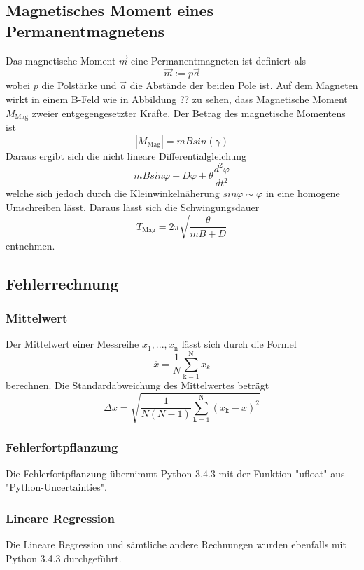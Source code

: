 \subsection{Magnetisches Moment eines Permanentmagnetens}
Das magnetische Moment $\vec{m}$  eine Permanentmagneten ist definiert als
\begin{equation}
  \vec{m} := p \vec{a}
  \label{eqn:m}
\end{equation}
wobei $p$ die Polstärke und $\vec{a}$ die Abstände der beiden Pole ist. Auf dem Magneten wirkt in einem B-Feld wie in Abbildung ?? zu sehen, dass Magnetische Moment $M_\text{Mag}$ zweier entgegengesetzter Kräfte. Der Betrag des magnetische Momentens ist
\begin{equation}
  |M_\text{Mag}| = m B sin(\gamma)
  \label{eqn:MM}
\end{equation}
Daraus ergibt sich die nicht lineare Differentialgleichung
\begin{equation}
  mBsin \varphi + D \varphi + \theta \frac{d^2 \varphi}{dt^2}
  \label{eqn:idgl}
\end{equation} welche sich jedoch durch die Kleinwinkelnäherung $sin \varphi \sim \varphi$ in eine homogene Umschreiben lässt. Daraus lässt sich die Schwingungsdauer
\begin{equation}
  T_\text{Mag} = 2 \pi \sqrt{\frac{\theta}{mB + D}}
  \label{eqn:Tmag}
\end{equation}
entnehmen.
\subsection{Fehlerrechnung}
\subsubsection{Mittelwert}
Der Mittelwert einer Messreihe $x_\text{1}, ... ,x_\text{n}$ lässt sich durch die Formel
\begin{equation}
	\overline{x} = \frac{1}{N} \sum_{\text{k}=1}^\text{N} x_k
	\label{eqn:ave}
\end{equation}
berechnen. Die Standardabweichung des Mittelwertes beträgt
\begin{equation}
	\Delta \overline{x} = \sqrt{ \frac{1}{N(N-1)} \sum_{\text{k}=1}^\text{N} (x_\text{k} - \overline{x})^2}
	\label{eqn:std}
\end{equation}

\subsubsection{Fehlerfortpflanzung}
Die Fehlerfortpflanzung übernimmt Python 3.4.3 mit der Funktion "ufloat" aus "Python-Uncertainties".

\subsubsection{Lineare Regression}
Die Lineare Regression und sämtliche andere Rechnungen wurden ebenfalls mit Python 3.4.3 durchgeführt.
